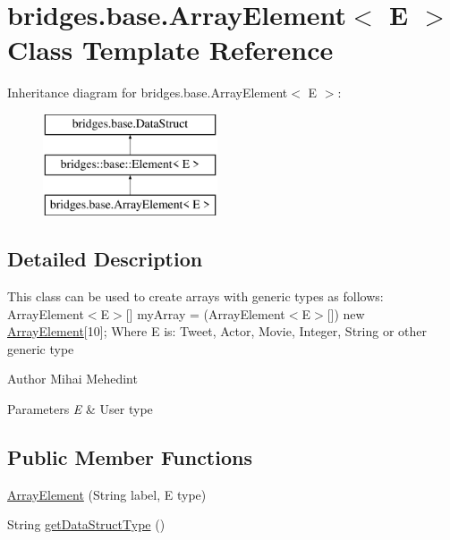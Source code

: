 \hypertarget{classbridges_1_1base_1_1_array_element}{}\section{bridges.\+base.\+Array\+Element$<$ E $>$ Class Template Reference}
\label{classbridges_1_1base_1_1_array_element}
Inheritance diagram for bridges.\+base.\+Array\+Element$<$ E $>$\+:\begin{figure}[H]
\begin{center}
\leavevmode
\includegraphics[height=3.000000cm]{classbridges_1_1base_1_1_array_element}
\end{center}
\end{figure}


\subsection{Detailed Description}
This class can be used to create arrays with generic types as follows\+: Array\+Element$<$\+E$>$\mbox{[}\mbox{]} my\+Array = (Array\+Element$<$\+E$>$\mbox{[}\mbox{]}) new \hyperlink{classbridges_1_1base_1_1_array_element}{Array\+Element}\mbox{[}10\mbox{]}; Where E is\+: Tweet, Actor, Movie, Integer, String or other generic type

\begin{DoxyAuthor}{Author}
Mihai Mehedint 
\end{DoxyAuthor}

\begin{DoxyParams}{Parameters}
{\em E} & User type \\
\hline
\end{DoxyParams}
\subsection*{Public Member Functions}
\begin{DoxyCompactItemize}
\item 
\hyperlink{classbridges_1_1base_1_1_array_element_a90cbba952d50ff26fd2b89e9f3f81322}{Array\+Element} (String label, E type)
\item 
String \hyperlink{classbridges_1_1base_1_1_array_element_a1d4f3fae7bd986237e364c2cce0bea77}{get\+Data\+Struct\+Type} ()
\end{DoxyCompactItemize}
